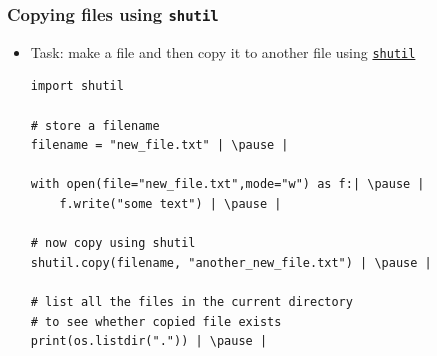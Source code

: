 \documentclass[xcolor=table]{beamer}
\begin{document}
\begin{frame}[fragile]
    \frametitle{Copying files using \texttt{shutil}}
\begin{itemize}
    \item Task: make a file and then copy it to another file using \href{https://docs.python.org/3/library/shutil.html}{\texttt{shutil}}
\begin{lstlisting}[style=python]
import shutil 

# store a filename 
filename = "new_file.txt" | \pause |

with open(file="new_file.txt",mode="w") as f:| \pause |
    f.write("some text") | \pause |

# now copy using shutil
shutil.copy(filename, "another_new_file.txt") | \pause |

# list all the files in the current directory
# to see whether copied file exists
print(os.listdir(".")) | \pause |

\end{lstlisting}
\end{itemize}
\end{frame}


\end{document}

